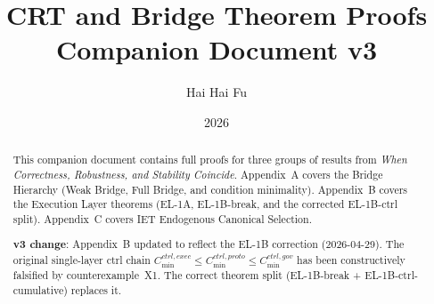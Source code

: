 \documentclass[11pt]{article}
\title{CRT and Bridge Theorem Proofs\\
  {\large Companion Document v3}}
\author{Hai Hai Fu}
\date{2026}
\theoremstyle{definition}
\newcommand{\Cmin}{C_{\min}}
\begin{document}
\maketitle

\begin{abstract}
This companion document contains full proofs for three groups of results
from \emph{When Correctness, Robustness, and Stability Coincide}.
Appendix~A covers the Bridge Hierarchy (Weak Bridge, Full Bridge, and
condition minimality). Appendix~B covers the Execution Layer theorems
(EL-1A, EL-1B-break, and the corrected EL-1B-ctrl split). Appendix~C
covers IET Endogenous Canonical Selection.

\textbf{v3 change}: Appendix~B updated to reflect the EL-1B correction
(2026-04-29). The original single-layer ctrl chain
$\Cmin^{ctrl,exec}\le\Cmin^{ctrl,proto}\le\Cmin^{ctrl,gov}$
has been constructively falsified by counterexample~X1. The correct
theorem split (EL-1B-break + EL-1B-ctrl-cumulative) replaces it.
\end{abstract}

\tableofcontents
\newpage

\appendix



\end{document}
